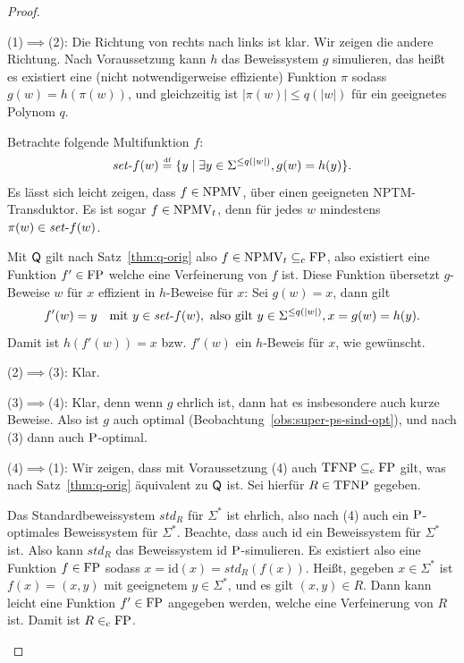\begin{proof}
    \begin{prooflist}
    \item (1)$\implies$(2): Die Richtung von rechts nach links ist klar. Wir zeigen die andere Richtung. Nach Voraussetzung kann $h$ das Beweissystem $g$ simulieren, das heißt es existiert eine (nicht notwendigerweise effiziente) Funktion $\pi$ sodass $g(w)=h(\pi(w))$, und gleichzeitig ist $|\pi(w)|\leq q(|w|)$ für ein geeignetes Polynom $q$.

Betrachte folgende Multifunktion $f$:
\[ \fset{}f(w) \defeq  \{ y \mid \exists y\in\Sigma^{\leq q(|w|)}, g(w)=h(y) \}. \]
Es lässt sich leicht zeigen, dass $f\in\NPMV$, über einen geeigneten NPTM-Transduktor. 
Es ist sogar $f\in\NPMV_t$, denn für jedes $w$ mindestens $\pi(w)\in \fset{}f(w)$.

Mit $\hQ$ gilt nach Satz~\ref{thm:q-orig} also $f\in\NPMV_t\subseteqc \FP$, also existiert eine Funktion $f'\in\FP$ welche eine Verfeinerung von $f$ ist. Diese Funktion übersetzt $g$-Beweise $w$ für $x$ effizient in $h$-Beweise für $x$: 
Sei $g(w)=x$, dann gilt
\[ f'(w) = y \quad\text{mit } y\in\fset{}f(w), \text{ also gilt } y\in\Sigma^{\leq q(|w|)}, x=g(w)=h(y). \]
Damit ist $h(f'(w))=x$ bzw. $f'(w)$ ein $h$-Beweis für $x$, wie gewünscht.

\item (2)$\implies$(3): Klar.

\item (3)$\implies$(4): Klar, denn wenn $g$ ehrlich ist, dann hat es insbesondere auch kurze Beweise. Also ist $g$ auch optimal (Beobachtung~\ref{obs:super-ps-sind-opt}), und nach (3) dann auch $\P$-optimal.

\item (4)$\implies$(1): Wir zeigen, dass mit Voraussetzung (4) auch $\TFNP\subseteqc \FP$ gilt, was nach Satz~\ref{thm:q-orig} äquivalent zu $\hQ$ ist. Sei hierfür $R\in\TFNP$ gegeben.

    Das Standardbeweissystem $\mathit{std}_R$ für $\Sigma^*$ ist ehrlich, also nach (4) auch ein $\P$-optimales Beweissystem für $\Sigma^*$. Beachte, dass auch $\mathrm{id}$ ein Beweissystem für $\Sigma^*$ ist. Also kann $\mathit{std}_R$ das Beweissystem $\mathrm{id}$ $\P$-simulieren. Es existiert also eine Funktion $f\in\FP$ sodass $x=\mathrm{id}(x)=\mathit{std}_R(f(x))$. Heißt, gegeben $x\in\Sigma^*$ ist $f(x)=(x,y)$ mit geeignetem $y\in\Sigma^*$, und es gilt $(x,y)\in R$. Dann kann leicht eine Funktion $f'\in\FP$ angegeben werden, welche eine Verfeinerung von $R$ ist. Damit ist $R\inc \FP$.
    \end{prooflist}
\end{proof}

